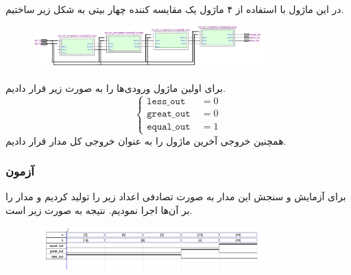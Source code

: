 \documentclass{perassignments}
\newcommand{\varseq}[1]{\texttt{#1} \;}
\begin{document}
	\subsubsection{}
	در این ماژول با استفاده از ۴ ماژول
	یک مقایسه کننده چهار بیتی به شکل زیر ساختیم.
	\begin{figure}[H]
		\centering
		\includegraphics[width = 0.8\textwidth]{graphics/fourbitcomp.png}
	\end{figure}
	برای اولین ماژول ورودی‌ها را به صورت زیر قرار دادیم.
	\begin{equation*}
		\begin{cases}
			\varseq{less\_out} &=0\\
			\varseq{great\_out} &= 0\\
			\varseq{equal\_out} &= 1
		\end{cases}
	\end{equation*}
	همچنین خروجی آخرین ماژول را به عنوان خروجی کل مدار قرار دادیم.
	\begin{latin}
		\raggedleft
		
	\end{latin}
	\subsubsection{آزمون}
	برای آزمایش و سنجش این مدار به صورت تصادفی اعداد زیر را تولید کردیم و مدار را بر آن‌ها اجرا نمودیم. نتیجه 
	به صورت زیر است.
	\begin{figure}[H]
		\centering
		\includegraphics[width = 0.8\textwidth]{graphics/wavefour.png}
	\end{figure}
\end{document}
